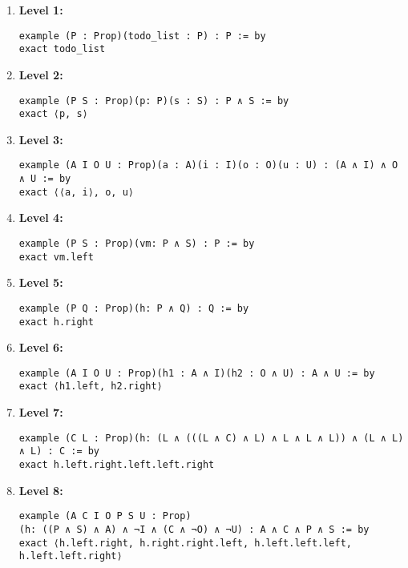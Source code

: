 \documentclass{article}
\begin{document}
\begin{enumerate}
    \item \textbf{Level 1:}
    \begin{lstlisting}[style=leanstyle]
example (P : Prop)(todo_list : P) : P := by
exact todo_list
    \end{lstlisting}

    \item \textbf{Level 2:}
    \begin{lstlisting}[style=leanstyle]
example (P S : Prop)(p: P)(s : S) : P ∧ S := by
exact ⟨p, s⟩
    \end{lstlisting}

    \item \textbf{Level 3:}
    \begin{lstlisting}[style=leanstyle]
example (A I O U : Prop)(a : A)(i : I)(o : O)(u : U) : (A ∧ I) ∧ O ∧ U := by
exact ⟨⟨a, i⟩, o, u⟩
    \end{lstlisting}

    \item \textbf{Level 4:}
    \begin{lstlisting}[style=leanstyle]
example (P S : Prop)(vm: P ∧ S) : P := by
exact vm.left
    \end{lstlisting}

    \item \textbf{Level 5:}
    \begin{lstlisting}[style=leanstyle]
example (P Q : Prop)(h: P ∧ Q) : Q := by
exact h.right
    \end{lstlisting}

    \item \textbf{Level 6:}
    \begin{lstlisting}[style=leanstyle]
example (A I O U : Prop)(h1 : A ∧ I)(h2 : O ∧ U) : A ∧ U := by
exact ⟨h1.left, h2.right⟩
    \end{lstlisting}

    \item \textbf{Level 7:}
    \begin{lstlisting}[style=leanstyle]
example (C L : Prop)(h: (L ∧ (((L ∧ C) ∧ L) ∧ L ∧ L ∧ L)) ∧ (L ∧ L) ∧ L) : C := by
exact h.left.right.left.left.right
    \end{lstlisting}

    \item \textbf{Level 8:}
    \begin{lstlisting}[style=leanstyle]
example (A C I O P S U : Prop)
(h: ((P ∧ S) ∧ A) ∧ ¬I ∧ (C ∧ ¬O) ∧ ¬U) : A ∧ C ∧ P ∧ S := by
exact ⟨h.left.right, h.right.right.left, h.left.left.left, h.left.left.right⟩
    \end{lstlisting}
\end{enumerate}
\end{document}
